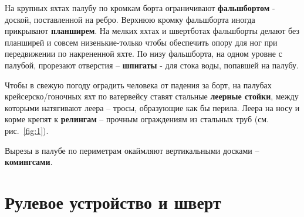 \documentclass[a4paper, 12pt, twoside, final]{scrbook}
\begin{document}
На крупных яхтах палубу по кромкам борта ограничивают \textbf{фальшбортом}
- доской, поставленной на ребро. Верхнюю кромку фальшборта иногда
прикрывают \textbf{планширем}. На мелких яхтах и швертботах фальшборты
делают без планширей и совсем низенькие-только чтобы обеспечить опору
для ног при передвижении по накрененной яхте. По низу фальшборта,
на одном уровне с палубой, прорезают отверстия \--- \textbf{шпигаты}
- для стока воды, попавшей на палубу.

Чтобы в свежую погоду оградить человека от падения за борт, на палубах
крейсерско\-/гоночных яхт по ватервейсу ставят стальные \textbf{леерные
стойки}, между которыми натягивают леера \--- тросы, образующие как бы
перила. Леера на носу и корме крепят к \textbf{релингам} \--- прочным
ограждениям из стальных труб (см. рис.~\ref{fig:1}).

Вырезы в палубе по периметрам окаймляют вертикальными досками \--- \textbf{комингсами}.

%
%

\section{Рулевое устройство и шверт}
\end{document}
